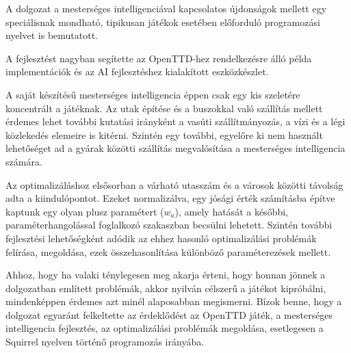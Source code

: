 
A dolgozat a mesterséges intelligenciával kapcsolatos újdonságok mellett egy speciálisnak mondható, tipikusan játékok esetében előforduló programozási nyelvet is bemutatott.

A fejlesztést nagyban segítette az OpenTTD-hez rendelkezésre álló példa implementációk és az AI fejlesztéshez kialakított eszközkészlet.

A saját készítésű mesterséges intelligencia éppen csak egy kis szeletére koncentrált a játéknak. Az utak építése és a buszokkal való szállítás mellett érdemes lehet további kutatási irányként a vasúti szállítmányozás, a vízi és a légi közlekedés elemeire is kitérni. Szintén egy további, egyelőre ki nem használt lehetőséget ad a gyárak közötti szállítás megvalósítása a mesterséges intelligencia számára.

Az optimalizáláshoz elsősorban a várható utasszám és a városok közötti távolság adta a kiindulópontot. Ezeket normalizálva, egy jósági érték számításba építve kaptunk egy olyan plusz paramétert ($w_a$), amely hatását a későbbi, paraméterhangolással foglalkozó szakaszban becsülni lehetett. Szintén további fejlesztési lehetőségként adódik az ehhez hasonló optimalizálási problémák felírása, megoldása, ezek összehasonlítása különböző paraméterezések mellett.

Ahhoz, hogy ha valaki ténylegesen meg akarja érteni, hogy honnan jönnek a dolgozatban említett problémák, akkor nyilván célszerű a játékot kipróbálni, mindenképpen érdemes azt minél alaposabban megismerni.
Bízok benne, hogy a dolgozat egyaránt felkeltette az érdeklődést az OpenTTD játék, a mesterséges intelligencia fejlesztés, az optimalizálási problémák megoldása, esetlegesen a Squirrel nyelven történő programozás irányába.
